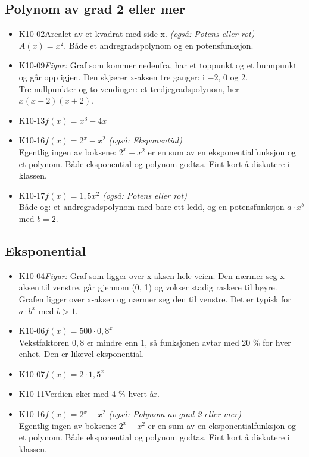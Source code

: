 \documentclass[11pt,a4paper]{article}
\begin{document}
\subsection*{Polynom av grad 2 eller mer}
\begin{itemize}[leftmargin=1.2em, itemsep=0.35em]
\item \textsf{\small K10-02}\quad Arealet av et kvadrat med side x. \emph{(også: Potens eller rot)}\\{\small\color{dempet}$A(x) = x^2$. Både et andregradspolynom og en potensfunksjon.}
\item \textsf{\small K10-09}\quad \emph{Figur:} Graf som kommer nedenfra, har et toppunkt og et bunnpunkt og går opp igjen. Den skjærer x-aksen tre ganger: i −2, 0 og 2.\\{\small\color{dempet}Tre nullpunkter og to vendinger: et tredjegradspolynom, her $x(x - 2)(x + 2)$.}
\item \textsf{\small K10-13}\quad $f(x) = x^3 - 4x$
\item \textsf{\small K10-16}\quad $f(x) = 2^x - x^2$ \emph{(også: Eksponential)}\\{\small\color{dempet}Egentlig ingen av boksene: $2^x - x^2$ er en sum av en eksponentialfunksjon og et polynom. Både eksponential og polynom godtas. Fint kort å diskutere i klassen.}
\item \textsf{\small K10-17}\quad $f(x) = 1{,}5x^2$ \emph{(også: Potens eller rot)}\\{\small\color{dempet}Både og: et andregradspolynom med bare ett ledd, og en potensfunksjon $a \cdot x^b$ med $b = 2$.}
\end{itemize}
\subsection*{Eksponential}
\begin{itemize}[leftmargin=1.2em, itemsep=0.35em]
\item \textsf{\small K10-04}\quad \emph{Figur:} Graf som ligger over x-aksen hele veien. Den nærmer seg x-aksen til venstre, går gjennom (0, 1) og vokser stadig raskere til høyre.\\{\small\color{dempet}Grafen ligger over x-aksen og nærmer seg den til venstre. Det er typisk for $a \cdot b^x$ med $b > 1$.}
\item \textsf{\small K10-06}\quad $f(x) = 500 \cdot 0{,}8^x$\\{\small\color{dempet}Vekstfaktoren $0{,}8$ er mindre enn $1$, så funksjonen avtar med $20$ \% for hver enhet. Den er likevel eksponential.}
\item \textsf{\small K10-07}\quad $f(x) = 2 \cdot 1{,}5^x$
\item \textsf{\small K10-11}\quad Verdien øker med 4 \% hvert år.
\item \textsf{\small K10-16}\quad $f(x) = 2^x - x^2$ \emph{(også: Polynom av grad 2 eller mer)}\\{\small\color{dempet}Egentlig ingen av boksene: $2^x - x^2$ er en sum av en eksponentialfunksjon og et polynom. Både eksponential og polynom godtas. Fint kort å diskutere i klassen.}
\end{itemize}
\end{document}
